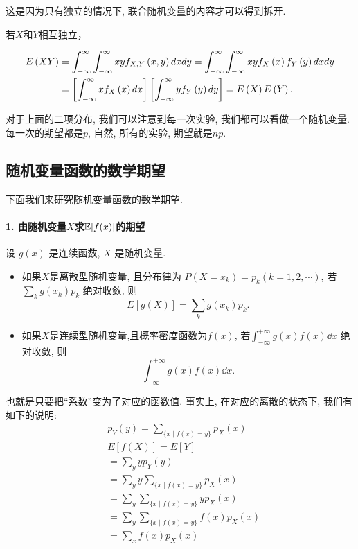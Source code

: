     这是因为只有独立的情况下, 联合随机变量的内容才可以得到拆开. 

    若$X$和$Y$相互独立，
        
        \begin{align}
            E\left(XY\right) &= \int_{-\infty}^{\infty}\int_{-\infty}^{\infty}xyf_{X,Y}\left(x,y\right){d}x{d}y = \int_{-\infty}^{\infty}\int_{-\infty}^{\infty}xyf_X\left(x\right)f_Y\left(y\right){d}x{d}y\notag\\
            & = \left[\int_{-\infty}^{\infty}xf_X\left(x\right){d}x\right]\left[\int_{-\infty}^{\infty}yf_Y\left(y\right){d}y\right] = E\left(X\right)E\left(Y\right).\notag
        \end{align}

    对于上面的二项分布, 我们可以注意到每一次实验, 我们都可以看做一个随机变量. 每一次的期望都是$p$, 自然, 所有的实验, 期望就是$np$. 

    
    \subsection{随机变量函数的数学期望}
    下面我们来研究随机变量函数的数学期望. 

    \paragraph{1. 由随机变量$X$求$\mathbb E[f(x)]$的期望} 设 $g(x)$ 是连续函数, $X$ 是随机变量.
    \begin{itemize}
        \item 如果$X$是离散型随机变量, 且分布律为 $P\left(X=x_k\right)=p_k(k=1,2, \cdots)$, 若 $\sum_k g\left(x_k\right) p_k$ 绝对收敛, 则
        $$
        E[g(X)]=\sum_k g\left(x_k\right) p_k .
        $$
        \item 如果$X$是连续型随机变量,且概率密度函数为$f(x)$, 若$\int_{-\infty}^{+\infty} g(x)f(x)\dd x$ 绝对收敛, 则
        $$\int_{-\infty}^{+\infty} g(x)f(x)\dd x.$$
    \end{itemize}
    
    也就是只要把``系数''变为了对应的函数值. 事实上, 在对应的离散的状态下, 我们有如下的说明: 
    \begin{align*} & p_Y(y)=\sum_{\{x \mid f(x)=y\}} p_X(x) \\ & E[f(X)]=E[Y] \\ & =\sum_y y p_Y(y) \\ & =\sum_y y \sum_{\{x \mid f(x)=y\}} p_X(x) \\ & =\sum_y \sum_{\{x \mid f(x)=y\}} y p_X(x) \\ & =\sum_y \sum_{\{x \mid f(x)=y\}} f(x) p_X(x) \\ & =\sum_x f(x) p_X(x)\end{align*}

